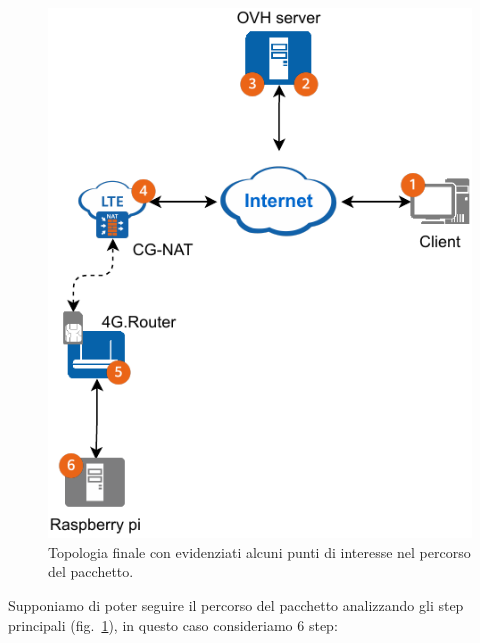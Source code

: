 \begin{figure}[H]
    \centering
    \includegraphics[width=0.5\linewidth]{immagini/diag2-test_real}
    \caption{Topologia finale con evidenziati alcuni punti di interesse nel percorso del pacchetto.}
    \label{fig:diag-test-real}
\end{figure}

Supponiamo di poter seguire il percorso del pacchetto analizzando gli step principali (fig.~\ref{fig:diag-test-real}), in questo caso consideriamo 6 step:


